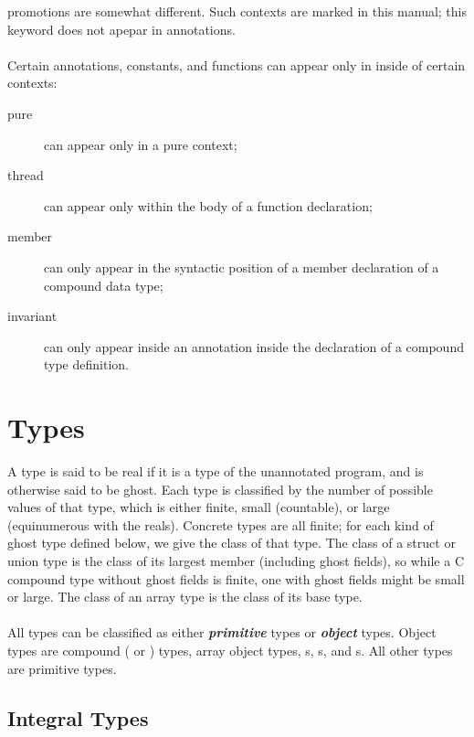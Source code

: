 \documentclass[preprint,nocopyrightspace]{sigplanconf}
\newcommand{\Def}[1]{\textit{\textbf{#1}}}
\begin{document}
{{promotions are somewhat different.  Such contexts are
marked  in this manual; this keyword does not apepar in
annotations.
\\\\
Certain annotations, constants, and functions can appear only in
inside of certain contexts: 
\begin{description}
\item[pure] can appear only in a pure context;
\item[thread] can appear only within the body of a function
declaration;
\item[member] can only appear in the syntactic position of a member
declaration of a compound data type;
\item[invariant] can only appear inside an  annotation
inside the declaration of a compound type definition.
\end{description}

\section{Types}
\label{sec:types}
A type is said to be real if it is a type of the unannotated program,
and is otherwise said to be ghost.
Each type is classified by the number of possible values of that type, which is
either finite, small (countable), or large (equinumerous with the
reals). Concrete types are all finite; for each kind of ghost type 
defined below, we give the class of that type. 
The class of a struct or union type is
the class of its largest member (including ghost fields), so while a C
compound type without ghost fields is finite, one with ghost fields
might be small or large. The class of an array type is the class of
its base type.
\\\\
All types can be classified as either \Def{primitive} types
or \Def{object} types. Object types are compound (
or ) types, array object types, \vcc{\thread}s, 
\vcc{\claim}s, and \vcc{\blob}s. All other types are primitive types.

\subsection{Integral Types}

}}
\end{document}
